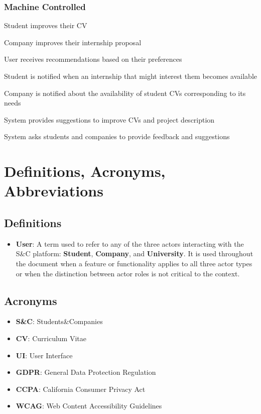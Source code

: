 \subsubsection*{Machine Controlled}
\begin{enumerate}[label={\textbf{[SP\arabic*]}}, leftmargin=1.52cm]
    \setcounter{enumi}{18}
    \item Student improves their CV 
    \item Company improves their internship proposal
    \item User receives recommendations based on their preferences
    \item Student is notified when an internship that might interest them becomes available
    \item Company is notified about the availability of student CVs corresponding to its needs
    \item System provides suggestions to improve CVs and project description
    \item System asks students and companies to provide feedback and suggestions
\end{enumerate}

\section{Definitions, Acronyms, Abbreviations}

\subsection{Definitions}
\begin{itemize}
    \item \textbf{User}: A term used to refer to any of the three actors interacting with the S\&C platform: \textbf{Student}, \textbf{Company}, and \textbf{University}. It is used throughout the document when a feature or functionality applies to all three actor types or when the distinction between actor roles is not critical to the context.
\end{itemize}
\subsection{Acronyms}
\begin{itemize}
    \item \textbf{S\&C}: Students\&Companies
    \item \textbf{CV}: Curriculum Vitae
    \item \textbf{UI}: User Interface
    \item \textbf{GDPR}: General Data Protection Regulation
    \item \textbf{CCPA}: California Consumer Privacy Act
    \item \textbf{WCAG}: Web Content Accessibility Guidelines
\end{itemize}
